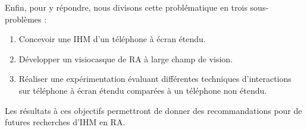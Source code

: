 Enfin, pour y répondre, nous divisons cette problématique en trois sous-problèmes :
\begin{enumerate}
  \item Concevoir une IHM d'un téléphone à écran étendu.
  \item Développer un visiocasque de RA à large champ de vision.
  \item Réaliser une expérimentation évaluant différentes techniques d'interactions sur téléphone à écran étendu comparées à un téléphone non étendu.
\end{enumerate}
\medskip

Les résultats à ces objectifs permettront de donner des recommandations pour de futures recherches d'IHM en RA.